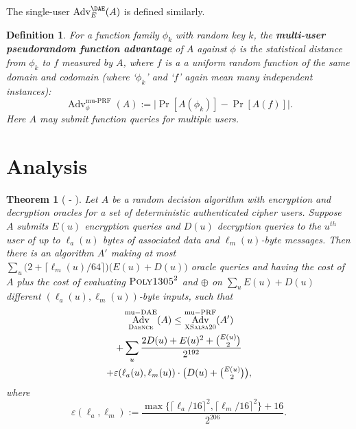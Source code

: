 \documentclass[draft]{article}
\newtheorem{definition}{Definition}
\newtheorem{theorem}{Theorem}
\newcommand{\term}[1]{\textbf{#1}}
\DeclareRobustCommand{\operatorsc}[1]{{%
  \ifmmode\let\next=\operatorname\else\let\next=\relax\fi\next{\textsc{#1}}}}
\def\Salsa#1/{\operatorsc{Salsa#1}}
\def\XSalsa#1/{\operatorsc{XSalsa#1}}
\def\Poly#1/{\operatorsc{Poly#1}}
\def\Daence/{\operatorsc{Daence}}
\DeclareMathOperator{\Adv}{Adv}
\DeclareMathOperator{\muDAE}{mu-DAE}
\DeclareMathOperator{\muPRF}{mu-PRF}
\newcommand{\collisionbound}{\varepsilon}
\begin{document}
The single-user $\Adv^{\DAE}_E(A)$ is defined similarly.

\begin{definition}
  For a function family $\phi_k$ with random key $k$, the
   \term{multi-user pseudorandom function advantage}
   of $A$ against $\phi$ is the statistical distance from $\phi_k$ to
   $f$ measured by $A$, where $f$ is a a uniform random function of
   the same domain and codomain (where `$\phi_k$' and `$f$' again
   mean many independent instances):
  \[
    \Adv^{\muPRF}_\phi(A) := \lvert\Pr[A(\phi_k)] - \Pr[A(f)]\rvert.
  \]
  Here $A$ may submit function queries for \emph{multiple} users.
\end{definition}

\section{Analysis}

\begin{theorem}[\Salsa20/-\Daence/]\label{thm-salsa20-daence}
  Let $A$ be a random decision algorithm with encryption and
   decryption oracles for a set of deterministic authenticated
   cipher users.
  Suppose $A$ submits $E(u)$ encryption queries and $D(u)$ decryption
   queries to the $u^{\mathit{th}}$ user of up to $\ell_a(u)$ bytes of
   associated data and $\ell_m(u)$-byte messages.
  Then there is an algorithm $A'$ making at most
   $\sum_u \bigl(2 + \lceil\ell_m(u)/64\rceil\bigr)
     \bigl(E(u) + D(u)\bigr)$
   oracle queries and having the cost of $A$ plus the cost of
   evaluating $\Poly1305/^2$ and $\oplus$ on
   $\sum_u E(u) + D(u)$
   different $(\ell_a(u), \ell_m(u))$-byte inputs,
   such that
%
  \begin{multline*}
    \Adv^{\muDAE}_{\Daence/}(A)
     \leq \Adv^{\muPRF}_{\XSalsa20/}(A') \\
            + \sum_u
                \frac{2 D(u) + E(u)^2 + \binom{E(u)}{2}}
                     {2^{192}} \\
                + \collisionbound(\ell_a(u), \ell_m(u))
                  \cdot
                  {\textstyle\bigl(D(u) + \binom{E(u)}{2}\bigr)},
  \end{multline*}
%
   where
  \[
    \collisionbound(\ell_a, \ell_m)
    := \frac{\max\{\lceil\ell_a/16\rceil^2, \lceil\ell_m/16\rceil^2\}
             + 16}
            {2^{206}}.
  \]
\end{theorem}
\end{document}
